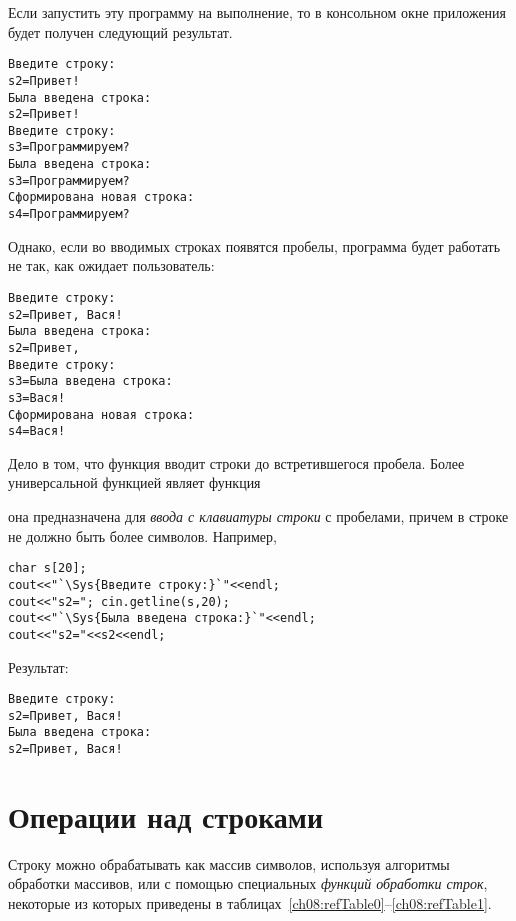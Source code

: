 Если запустить эту программу на выполнение, то в консольном окне приложения будет получен следующий результат.
\begin{verbatim}
Введите строку:
s2=Привет!
Была введена строка:
s2=Привет!
Введите строку:
s3=Программируем?
Была введена строка:
s3=Программируем?
Сформирована новая строка:
s4=Программируем?
\end{verbatim}
Однако, если во вводимых строках появятся пробелы, программа будет работать не так, как ожидает пользователь:
\begin{verbatim}
Введите строку:
s2=Привет, Вася!
Была введена строка:
s2=Привет,
Введите строку:
s3=Была введена строка:
s3=Вася!
Сформирована новая строка:
s4=Вася!
\end{verbatim}
Дело в том, что функция  вводит строки до встретившегося пробела. Более универсальной функцией
являет функция


она предназначена для \emph{ввода с клавиатуры строки}  с пробелами,
причем в строке не должно быть более  символов. Например,
\begin{lstlisting}
char s[20];
cout<<"`\Sys{Введите строку:}`"<<endl;
cout<<"s2="; cin.getline(s,20);
cout<<"`\Sys{Была введена строка:}`"<<endl;
cout<<"s2="<<s2<<endl;
\end{lstlisting}

Результат:
\begin{verbatim}
Введите строку:
s2=Привет, Вася!
Была введена строка:
s2=Привет, Вася!
\end{verbatim}

\section[Операции над строками]{Операции над строками}\label{ch08:2}
Строку можно обрабатывать как массив символов, используя алгоритмы обработки массивов, или с помощью специальных
\emph{функций обработки строк},
некоторые из которых приведены в таблицах~\ref{ch08:refTable0}--\ref{ch08:refTable1}. 

